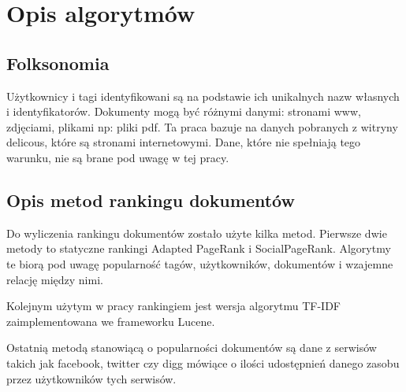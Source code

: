 \chapter{Opis algorytmów}


\section{Folksonomia}



Użytkownicy i tagi identyfikowani są na podstawie ich unikalnych nazw własnych i identyfikatorów. Dokumenty mogą być różnymi danymi: stronami www, zdjęciami, plikami np: pliki pdf. Ta praca bazuje na danych pobranych z witryny delicous, które są stronami internetowymi. Dane, które nie spełniają tego warunku, nie są brane pod uwagę w tej pracy. 

\section{Opis metod rankingu dokumentów}

Do wyliczenia rankingu dokumentów zostało użyte kilka metod. Pierwsze dwie metody to statyczne rankingi Adapted PageRank i SocialPageRank. Algorytmy te biorą pod uwagę popularność tagów, użytkowników, dokumentów i wzajemne relację między nimi. 

Kolejnym użytym w pracy rankingiem jest wersja algorytmu TF-IDF zaimplementowana we frameworku Lucene. 

Ostatnią metodą stanowiącą o popularności dokumentów są dane z serwisów takich jak facebook, twitter czy digg mówiące o ilości udostępnień danego zasobu przez użytkowników tych serwisów. 








